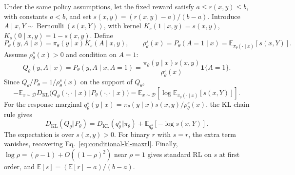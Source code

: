 Under the same policy assumptions, let the fixed reward satisfy
$a\le r(x,y)\le b$, with constants $a<b$, and set
$s(x,y)=(r(x,y)-a)/(b-a)$.
Introduce $A\mid x,Y\sim\operatorname{Bernoulli}(s(x,Y))$, with kernel
$K_s(1\mid x,y)=s(x,y)$, $K_s(0\mid x,y)=1-s(x,y)$. Define
\begin{equation}
 P_\theta(y,A\mid x)=\pi_\theta(y\mid x)K_s(A\mid x,y),
 \qquad
 \rho_\theta^s(x)=P_\theta(A=1\mid x)
 =\mathbb E_{\pi_\theta(\cdot\mid x)}[s(x,Y)].
 \label{eq:app-randomized-joint}
\end{equation}
Assume $\rho_\theta^s(x)>0$ and condition on $A=1$:
\begin{equation}
 Q_\theta(y,A\mid x)
 =P_\theta(y,A\mid x,A=1)
 =\frac{\pi_\theta(y\mid x)s(x,y)}{\rho_\theta^s(x)}
   \mathbf1\{A=1\}.
 \label{eq:app-randomized-target}
\end{equation}
Since $Q_\theta/P_\theta=1/\rho_\theta^s(x)$ on the support of $Q_\theta$,
\begin{equation}
 -\mathbb E_{x\sim\mathcal D}
 D_{\mathrm{KL}}\bigl(Q_\theta(\cdot,\cdot\mid x)
                 \Vert P_\theta(\cdot,\cdot\mid x)\bigr)
 =\mathbb E_{x\sim\mathcal D}
   \left[\log\mathbb E_{\pi_\theta(\cdot\mid x)}[s(x,Y)]\right].
 \label{eq:app-randomized-kl}
\end{equation}
For the response marginal
$q_\theta^s(y\mid x)=\pi_\theta(y\mid x)s(x,y)/\rho_\theta^s(x)$,
the KL chain rule gives
\begin{equation}
 D_{\mathrm{KL}}(Q_\theta\Vert P_\theta)
 =D_{\mathrm{KL}}(q_\theta^s\Vert\pi_\theta)
  +\mathbb E_{q_\theta^s}[-\log s(x,Y)].
 \label{eq:app-randomized-marginal-kl}
\end{equation}
The expectation is over $s(x,y)>0$. For binary $r$ with $s=r$,
the extra term vanishes, recovering Eq.~\eqref{eq:conditional-kl-maxrl}.
Finally, $\log\rho=(\rho-1)+O((1-\rho)^2)$ near $\rho=1$ gives
standard RL on $s$ at first order, and
$\mathbb E[s]=(\mathbb E[r]-a)/(b-a)$.

